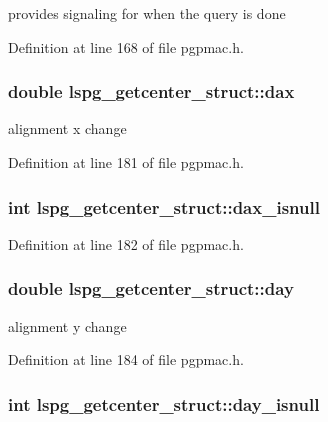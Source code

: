 provides signaling for when the query is done 



Definition at line 168 of file pgpmac.\-h.

\hypertarget{structlspg__getcenter__struct_a17db52848c28852a470222ec93ae8886}{
\subsubsection[{dax}]{\setlength{\rightskip}{0pt plus 5cm}double lspg\-\_\-getcenter\-\_\-struct\-::dax}}\label{structlspg__getcenter__struct_a17db52848c28852a470222ec93ae8886}


alignment x change 



Definition at line 181 of file pgpmac.\-h.

\hypertarget{structlspg__getcenter__struct_a621b489777d61e9db8b33b784b8d70f9}{
\subsubsection[{dax\-\_\-isnull}]{\setlength{\rightskip}{0pt plus 5cm}int lspg\-\_\-getcenter\-\_\-struct\-::dax\-\_\-isnull}}\label{structlspg__getcenter__struct_a621b489777d61e9db8b33b784b8d70f9}


Definition at line 182 of file pgpmac.\-h.

\hypertarget{structlspg__getcenter__struct_a9ce0f29540f2ff47be9788565d19f1b8}{
\subsubsection[{day}]{\setlength{\rightskip}{0pt plus 5cm}double lspg\-\_\-getcenter\-\_\-struct\-::day}}\label{structlspg__getcenter__struct_a9ce0f29540f2ff47be9788565d19f1b8}


alignment y change 



Definition at line 184 of file pgpmac.\-h.

\hypertarget{structlspg__getcenter__struct_a36f57a319288810caf365cca7827ff96}{
\subsubsection[{day\-\_\-isnull}]{\setlength{\rightskip}{0pt plus 5cm}int lspg\-\_\-getcenter\-\_\-struct\-::day\-\_\-isnull}}\label{structlspg__getcenter__struct_a36f57a319288810caf365cca7827ff96}


